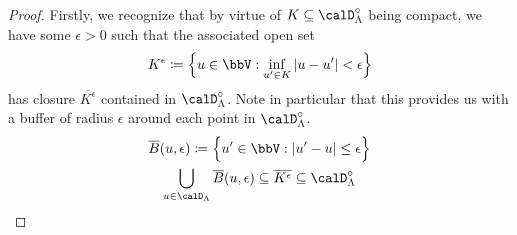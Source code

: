 \begin{proof}
  \label{proof:proposition:compact-ode-existence}
  Firstly, we recognize that by virtue of $K \subseteq \odeSpace^\circ$ being compact, we have some $\epsilon > 0$ such that the associated open set
  \begin{equation*}
    K^\epsilon \defeq \Big\{ \momentVar \in \vecSpace : \inf_{\momentVar' \in K} |\momentVar - \momentVar'| < \epsilon \Big\}
  \end{equation*}
  has closure $\overline{K^\epsilon}$ contained in $\odeSpace^\circ$.
  Note in particular that this provides us with a buffer of radius $\epsilon$ around each point in $\odeSpace^\circ$.
  \begin{gather*}
    \overline B(\momentVar, \epsilon) \defeq \Big\{ \momentVar' \in \vecSpace : |\momentVar' - \momentVar| \leq \epsilon \Big\} \\
    \bigcup_{\momentVar \in \odeSpace} \overline B(\momentVar, \epsilon) \subseteq \overline{K^\epsilon} \subseteq \odeSpace^\circ
  \end{gather*}


\end{proof}
